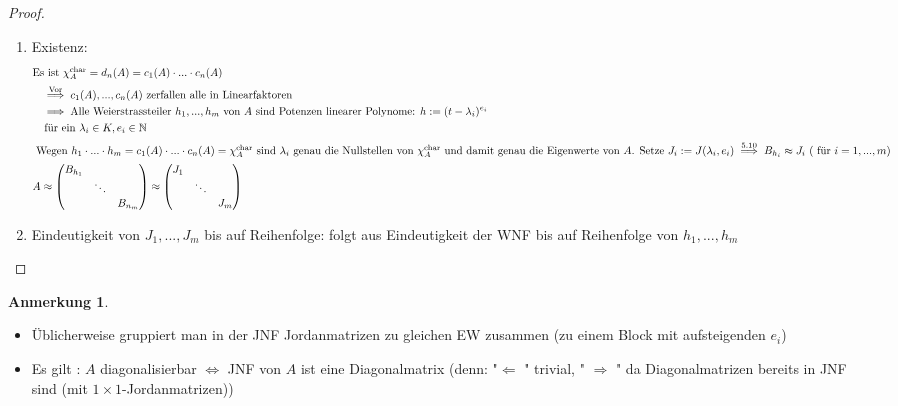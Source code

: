 \documentclass[a4paper, titlepage]{article}
\theoremstyle{definition}
\newtheorem*{anm}{Anmerkung}
\newcommand{\N}{\mathbb{N}}
\begin{document}
    \begin{proof}
        \begin{enumerate}[1.]
            \item Existenz: \begin{align*}
                \intertext{Es ist $\chi_{A}^{\text{char}}=d_n(A)=c_1(A)\cdot ...\cdot c_n(A)$}
                &\overset{\text{Vor}}{\implies} c_1(A),...,c_n(A) \text{ zerfallen alle in Linearfaktoren}\\
                &\implies \text{Alle Weierstrassteiler }h_1,...,h_m \text{ von } A \text{ sind Potenzen linearer Polynome: }h:=(t-\lambda_i)^{e_i}\\
                &\text{ für ein }\lambda_i\in K,e_i\in \N\\
                \intertext{ Wegen $h_1\cdot...\cdot h_m=c_1(A)\cdot ...\cdot c_n(A)=\chi_{A}^{\text{char}}$ sind $\lambda_i$ genau die Nullstellen von $\chi_{A}^{\text{char}}$ und damit genau die Eigenwerte von $A$. Setze $J_i:=J(\lambda_i,e_i)\overset{5.10}{\implies} B_{h_i}\approx J_i$ ( für $i=1,...,m$)}
                A&\approx \begin{pmatrix}
                    B_{h_1}& & \\
                    & \ddots & \\
                    & & B_{n_m}
                \end{pmatrix} \approx \begin{pmatrix}
                    J_1 & &\\
                    & \ddots & \\
                    & & J_m
                \end{pmatrix}
            \end{align*}
    \item Eindeutigkeit von $J_1,...,J_m$ bis auf Reihenfolge: folgt aus Eindeutigkeit der WNF bis auf Reihenfolge von $h_1,...,h_m$
    \end{enumerate}
    \end{proof}
    \begin{anm}
        \begin{itemize}
        \item Üblicherweise gruppiert man in der JNF Jordanmatrizen zu gleichen EW zusammen (zu einem Block mit aufsteigenden $e_i$)
        \item Es gilt : $A$ diagonalisierbar $\Leftrightarrow$ JNF von $A$ ist eine Diagonalmatrix (denn: "$\Leftarrow$ " trivial, " $ \Rightarrow$ " da Diagonalmatrizen bereits in JNF sind (mit $1\times 1$-Jordanmatrizen))
        \end{itemize}
    \end{anm}
\end{document}
